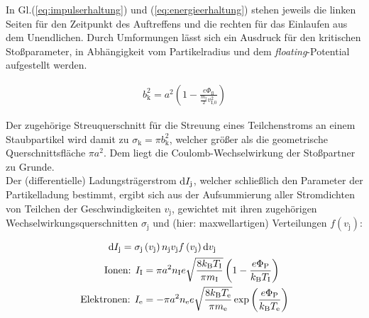 \documentclass[numbers=noenddot,a4paper]{scrartcl}
\newcommand{\diff}{\textnormal{d}}
\newcommand{\ix}[1]{_\text{#1}}
\newcommand{\tilt}[1]{\textit{#1}}
\begin{document}
		In Gl.(\ref{eq:impulserhaltung}) und (\ref{eq:energieerhaltung}) stehen jeweils die linken Seiten für den Zeitpunkt des Auftreffens und die rechten für das Einlaufen aus dem Unendlichen. Durch Umformungen lässt sich ein Ausdruck für den kritischen Stoßparameter, in Abhängigkeit vom Partikelradius und dem \tilt{floating}-Potential aufgestellt werden.
		
			\begin{align}
				b\ix{k}^2=a^2\left(1-\frac{e\Phi\ix{fl}}{\frac{m\ix{I}}{2}v\ix{I,0}^2}\right) \label{eq:krit}
			\end{align}
			
		Der zugehörige Streuquerschnitt für die Streuung eines Teilchenstroms an einem Staubpartikel wird damit zu $\sigma\ix{k}=\pi b\ix{k}^2$, welcher größer als die geometrische Querschnittsfläche $\pi a^2$. Dem liegt die Coulomb-Wechselwirkung der Stoßpartner zu Grunde.\\
		Der (differentielle) Ladungsträgerstrom $\diff I\ix{j}$, welcher schließlich den Parameter der Partikelladung bestimmt, ergibt sich aus der Aufsummierung aller Stromdichten von Teilchen der Geschwindigkeiten $v\ix{j}$, gewichtet mit ihren zugehörigen Wechselwirkungsquerschnitten $\sigma\ix{j}$ und (hier: maxwellartigen) Verteilungen $f\left(v\ix{j}\right)$:
		
			\begin{align}
				\diff I\ix{j}=\sigma\ix{j}&\left(v\ix{j}\right)n\ix{j}v\ix{j}f\left(v\ix{j}\right)\diff v\ix{j} \nonumber \\
				\text{Ionen: } I\ix{I}&=\pi a^2n\ix{I}e\sqrt{\frac{8k\ix{B}T\ix{I}}{\pi m\ix{I}}}\left(1-\frac{e\Phi\ix{P}}{k\ix{B}T\ix{I}}\right) \label{eq:ionenstrom} \\
				\text{Elektronen: } I\ix{e}&=-\pi a^2n\ix{e}e\sqrt{\frac{8k\ix{B}T\ix{e}}{\pi m\ix{e}}}\exp\left(\frac{e\Phi\ix{P}}{k\ix{B}T\ix{e}}\right) \label{eq:elektronenstrom}
			\end{align}
			
\end{document}
